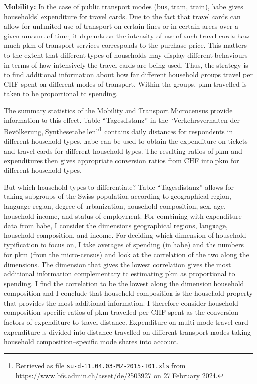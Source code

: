 \documentclass[a4paper,11pt,abstract=true]{scrartcl}
\begin{document}
{\bfseries Mobility:}
In the case of public transport modes (bus, tram, train), \ac{habe} gives households' expenditure for travel cards.
Due to the fact that travel cards can allow for unlimited use of transport on certain lines or in certain areas over a given amount of time, it depends on the intensity of use of such travel cards how much \ac{pkm} of transport services corresponds to the purchase price.
This matters to the extent that different types of households may display different behaviours in terms of how intensively the travel cards are being used.
Thus, the strategy is to find additional information about how far different household groups travel per CHF spent on different modes of transport.
Within the groups, \ac{pkm} travelled is taken to be proportional to spending.

The summary statistics of the Mobility and Transport Microcensus  \citep{biedermann_verkehrsverhalten_2017} provide information to this effect.
Table ``Tagesdistanz'' in the ``Ver\-kehrs\-ver\-hal\-ten der Be\-völ\-ke\-rung, Synthesetabellen''\footnote{Retrieved as file \texttt{su-d-11.04.03-MZ-2015-T01.xls} from \url{https://www.bfs.admin.ch/asset/de/2503927} on 27 February 2024.} contains daily distances for respondents in different household types.
\ac{habe} can be used to obtain the expenditure on tickets and travel cards for different household types.
The resulting ratios of \ac{pkm} and expenditures then gives appropriate conversion ratios from CHF into \ac{pkm} for different household types.

But which household types to differentiate?
Table ``Tagesdistanz'' allows for taking subgroups of the Swiss population according to geographical region, language region, degree of urbanization, household composition, sex, age, household income, and status of employment.
For combining with expenditure data from \ac{habe}, I consider the dimensions geographical regions, language, household composition, and income.
For deciding which dimension of household typification to focus on, I take averages of spending (in \ac{habe}) and the numbers for \ac{pkm} (from the micro-census) and look at the correlation of the two along the dimensions.
The dimension that gives the lowest correlation gives the most additional information complementary to estimating \ac{pkm} as proportional to spending.
I find the correlation to be the lowest along the dimension household composition and I conclude that household composition is the household property that provides the most additional information.
I therefore consider household composition--specific ratios of \ac{pkm} travelled per CHF spent as the conversion factors of expenditure to travel distance.
Expenditure on multi-mode travel card expenditure is divided into distance travelled on different transport modes taking household composition--specific mode shares into account.
\end{document}
